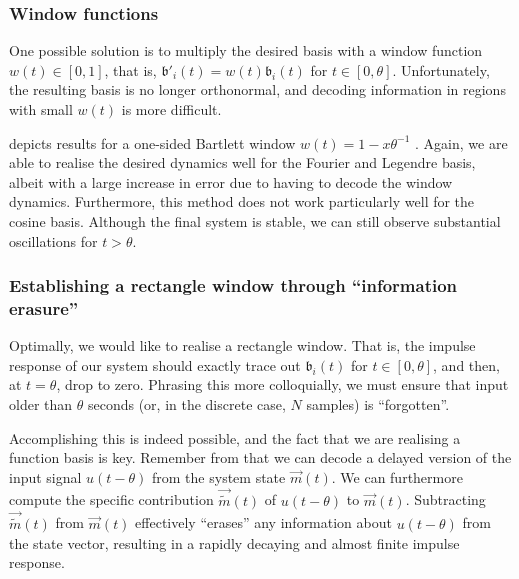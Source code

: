 \subsubsection{Window functions}
One possible solution is to multiply the desired basis with a window function $w(t) \in [0, 1]$, that is, $\mathfrak{b}'_i(t) = w(t) \mathfrak{b}_i(t)$ for $t \in [0, \theta]$.
Unfortunately, the resulting basis is no longer orthonormal, and decoding information in regions with small $w(t)$ is more difficult.

 depicts results for a one-sided Bartlett window $w(t) = 1 - x \theta^{-1}$ \citep[cf.][Section~7.5]{oppenheim2009discretetime}.
Again, we are able to realise the desired dynamics well for the Fourier and Legendre basis, albeit with a large increase in error due to having to decode the window dynamics.
Furthermore, this method does not work particularly well for the cosine basis.
Although the final system is stable, we can still observe substantial oscillations for $t > \theta$.

\subsubsection{Establishing a rectangle window through \enquote{information erasure}}
Optimally, we would like to realise a rectangle window.
That is, the impulse response of our system should exactly trace out $\mathfrak{b}_i(t)$ for $t \in [0, \theta]$, and then, at $t = \theta$, drop to zero.
Phrasing this more colloquially, we must ensure that input older than $\theta$ seconds (or, in the discrete case, $N$ samples) is \enquote{forgotten}.

Accomplishing this is indeed possible, and the fact that we are realising a function basis is key.
Remember from  that we can decode a delayed version of the input signal $u(t - \theta)$ from the system state $\vec m(t)$.
We can furthermore compute the specific contribution $\vec{\tilde m}(t)$ of $u(t - \theta)$ to $\vec m(t)$.
Subtracting $\vec{\tilde m}(t)$ from $\vec m(t)$ effectively \enquote{erases} any information about $u(t - \theta)$ from the state vector, resulting in a rapidly decaying and almost finite impulse response.

